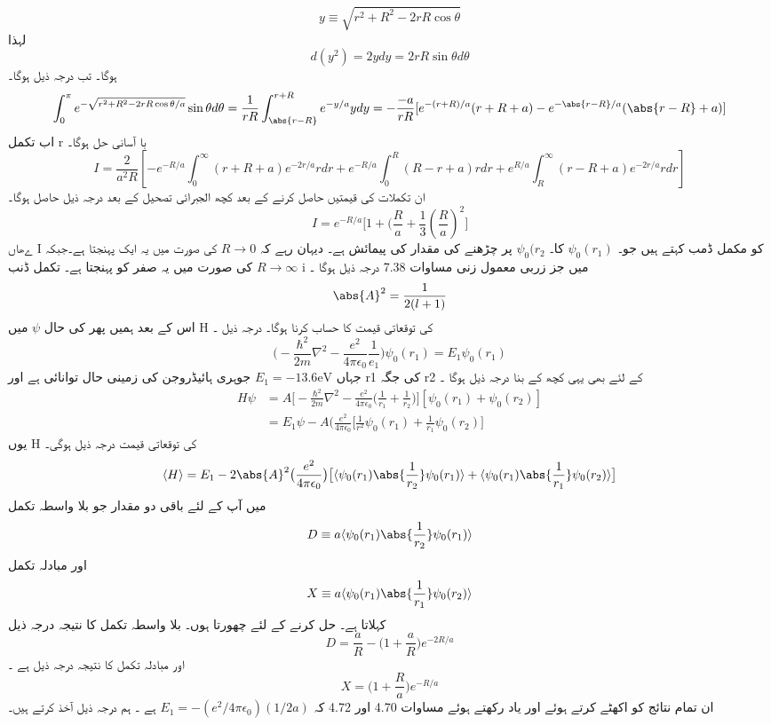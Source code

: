 \[y\equiv\sqrt{r^{2}+R^{2}-2rR\cos{\theta}}\]
لہذا 
\[d(y^{2})=2ydy=2rR\sin{\theta}d\theta\]
ہوگا۔ تب درجہ ذیل ہوگا۔
\[\int_{0}^{\pi}e^{-\sqrt{r^{2}+R^{2}-2rR\cos{\theta/a}}}\sin{\theta}d\theta=\frac{1}{rR}\int_{\abs{r-R}}^{r+R}e^{-y/a}ydy=-\frac{-a}{rR}[e^{-(r+R)/a}(r+R+a)-e^{-\abs{r-R}/a}(\abs{r-R}+a)]\]
اب تکمل r با آسانی حل ہوگا۔ 
\[I=\frac{2}{a^{2}R}[-e^{-R/a}\int_{0}^{\infty}(r+R+a)e^{-2r/a}rdr+e^{-R/a}\int_{0}^{R}(R-r+a)rdr+e^{R/a}\int_{R}^{\infty}(r-R+a)e^{-2r/a}rdr]\]
ان تکملات کی قیمتیں حاصل کرنے کے بعد کچھ الجبرائی تصحیل کے بعد درجہ ذیل حاصل ہوگا۔
\[I=e^{-R/a}\big[1+(\frac{R}{a}+\frac{1}{3}(\frac{R}{a})^{2}\big]\]
ےھاں  ٰI کو مکمل ڈمب کہتے ہیں جو۔
\(\psi_{0}(r_{1})\)
 کا۔
 \(\psi_{0}(r_{2}\)
 پر چڑھنے کی مقدار کی پیمائش ہے۔ دیہان رہے کہ 
 \(R\rightarrow 0\)
  کی صورت میں یہ ایک پہنجتا ہے۔جبکہ 
  \(R\rightarrow \infty\)
   کی صورت میں یہ صفر کو پہنجتا ہے۔ تکمل ڈنب i میں جز زربی معمول زنی مساوات 7.38 درجہ ذیل ہوگا ۔\\
\[\abs{A}^{2}=\frac{1}{2(l+1)}\]
اس کے بعد ہمیں پھر کی حال 
\(\psi\)
 میں H کی توقعاتی قیمت کا حساب کرنا ہوگا۔ درجہ ذیل ۔
 \[\big(-\frac{\hbar^{2}}{2m}\nabla^{2}-\frac{e^{2}}{4\pi\epsilon_{0}}\frac{1}{e_{1}}\big)\psi_{0}(r_{1})=E_{1}\psi_{0}(r_{1})\]
  جہاں 
  \(E_{1}=-13.6\text{eV}\)
  جوہری ہائیڈروجن کی زمینی حال توانائی ہے اور r1 کی جگہ r2 کے لئے بھی یہی کچھ کے بنا  درجہ ذیل ہوگا ۔
\begin{align*}
H\psi&=A\big[-\frac{\hbar^{2}}{2m}\nabla^{2}-\frac{e^{2}}{4\pi\epsilon_{0}}\big(\frac{1}{r_{1}}+\frac{1}{r_{2}}\big)\big][\psi_{0}(r_{1})+\psi_{0}(r_{2})]\\
&=E_{1}\psi-A(\frac{e^{2}}{4\pi\epsilon_{0}}\big[\frac{1}{r^{2}}\psi_{0}(r_{1})+\frac{1}{r_{1}}\psi_{0}(r_{2})\big]
\end{align*}
یوں H کی توقعاتی قیمت درجہ ذیل ہوگی۔
\[\langle H \rangle =E_{1}-2\abs{A}^{2}\big(\frac{e^{2}}{4\pi\epsilon_{0}}\big)\big[\langle \psi_{0}(r_{1})\abs{\frac{1}{r_{2}}}\psi_{0}(r_{1})\rangle +\langle \psi_{0}(r_{1})\abs{\frac{1}{r_{1}}}\psi_{0}(r_{2})\rangle\big]\]
میں آپ کے لئے باقی دو مقدار جو بلا واسطہ تکمل 
\[D\equiv a\langle \psi_{0}(r_{1})\abs{\frac{1}{r_{2}}}\psi_{0}(r_{1})\rangle\]
اور
مبادلہ تکمل 
\[X\equiv a\langle\psi_{0}(r_{1})\abs{\frac{1}{r_{1}}}\psi_{0}(r_{2})\rangle\]
کہلاتا ہے۔ حل کرنے کے لئے چھورتا ہوں۔ بلا واسطہ تکمل کا نتیجہ درجہ ذیل 
\[D=\frac{a}{R}-\big(1+\frac{a}{R}\big)e^{-2R/a}\]
اور مبادلہ تکمل کا نتیجہ درجہ ذیل ہے ۔ 
\[X=\big(1+\frac{R}{a}\big)e^{-R/a}\]
ان تمام نتائج کو اکھٹے کرتے ہوئے اور یاد رکھتے ہوئے مساوات 4.70 اور 4.72 کہ 
\(E_{1}=-(e^{2}/4\pi\epsilon_{0})(1/2a)\)
ہے ۔ ہم درجہ ذیل آخذ کرتے ہیں۔
